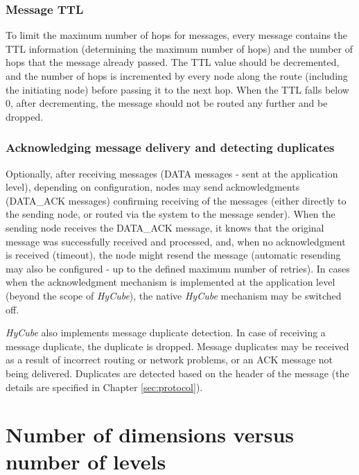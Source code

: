 \subsubsection{Message TTL}

To limit the maximum number of hops for messages, every message contains the TTL information (determining the maximum number of hops) and the number of hops that the message already passed. The TTL value should be decremented, and the number of hops is incremented by every node along the route (including the initiating node) before passing it to the next hop. When the TTL falls below 0, after decrementing, the message should not be routed any further and be dropped.



\subsubsection{Acknowledging message delivery and detecting duplicates}

Optionally, after receiving messages (DATA messages - sent at the application level), depending on configuration, nodes may send acknowledgments (DATA\_ACK messages) confirming receiving of the messages (either directly to the sending node, or routed via the system to the message sender). When the sending node receives the DATA\_ACK message, it knows that the original message was successfully received and processed, and, when no acknowledgment is received (timeout), the node might resend the message (automatic resending may also be configured - up to the defined maximum number of retries). In cases when the acknowledgment mechanism is implemented at the application level (beyond the scope of \emph{HyCube}), the native \emph{HyCube} mechanism may be switched off.

\emph{HyCube} also implements message duplicate detection. In case of receiving a message duplicate, the duplicate is dropped. Message duplicates may be received as a result of incorrect routing or network problems, or an ACK message not being delivered. Duplicates are detected based on the header of the message (the details are specified in Chapter \ref{sec:protocol}).






\section{Number of dimensions versus number of levels}

